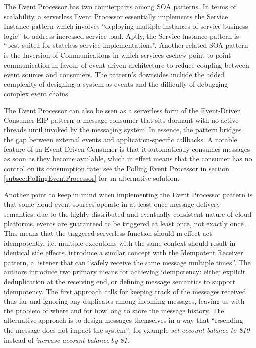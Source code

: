 The Event Processor has two counterparts among SOA patterns. In terms of scalability, a serverless Event Processor essentially implements the Service Instance pattern which involves ``deploying multiple instances of service business logic'' to address increased service load. Aptly, the Service Instance pattern is ``best suited for stateless service implementations''. Another related SOA pattern is the Inversion of Communications in which services eschew point-to-point communication in favour of event-driven architecture to reduce coupling between event sources and consumers. The pattern's downsides include the added complexity of designing a system as events and the difficulty of debugging complex event chains. \parencite{rotem12soa}

The Event Processor can also be seen as a serverless form of the Event-Driven Consumer EIP pattern: a message consumer that sits dormant with no active threads until invoked by the messaging system. In essence, the pattern bridges the gap between external events and application-specific callbacks. A notable feature of an Event-Driven Consumer is that it automatically consumes messages as soon as they become available, which in effect means that the consumer has no control on its consumption rate: see the Polling Event Processor in section \ref{subsec:PollingEventProcessor} for an alternative solution. \parencite{hohpe2004enterprise}

Another point to keep in mind when implementing the Event Processor pattern is that some cloud event sources operate in at-least-once message delivery semantics: due to the highly distributed and eventually consistent nature of cloud platforms, events are guaranteed to be triggered at least once, not exactly once \parencite{awslambda0218}. This means that the triggered serverless function should in effect act idempotently, i.e. multiple executions with the same context should result in identical side effects. \textcite{hohpe2004enterprise} introduce a similar concept with the Idempotent Receiver pattern, a listener that can ``safely receive the same message multiple times''. The authors introduce two primary means for achieving idempotency: either explicit deduplication at the receiving end, or defining message semantics to support idempotency. The first approach calls for keeping track of the messages received thus far and ignoring any duplicates among incoming messages, leaving us with the problem of where and for how long to store the message history. The alternative approach is to design messages themselves in a way that ``resending the message does not impact the system'': for example \textit{set account balance to \$10} instead of \textit{increase account balance by \$1}.

